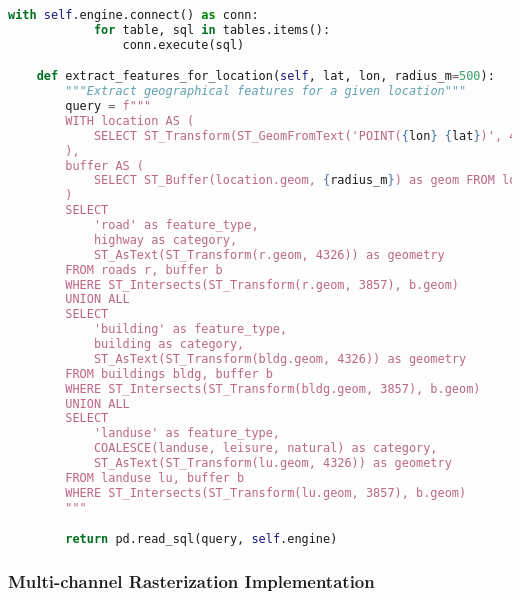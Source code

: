 \begin{lstlisting}[language=Python, caption=Complete OSM Data Processing Pipeline]
        with self.engine.connect() as conn:
            for table, sql in tables.items():
                conn.execute(sql)

    def extract_features_for_location(self, lat, lon, radius_m=500):
        """Extract geographical features for a given location"""
        query = f"""
        WITH location AS (
            SELECT ST_Transform(ST_GeomFromText('POINT({lon} {lat})', 4326), 3857) as geom
        ),
        buffer AS (
            SELECT ST_Buffer(location.geom, {radius_m}) as geom FROM location
        )
        SELECT
            'road' as feature_type,
            highway as category,
            ST_AsText(ST_Transform(r.geom, 4326)) as geometry
        FROM roads r, buffer b
        WHERE ST_Intersects(ST_Transform(r.geom, 3857), b.geom)
        UNION ALL
        SELECT
            'building' as feature_type,
            building as category,
            ST_AsText(ST_Transform(bldg.geom, 4326)) as geometry
        FROM buildings bldg, buffer b
        WHERE ST_Intersects(ST_Transform(bldg.geom, 3857), b.geom)
        UNION ALL
        SELECT
            'landuse' as feature_type,
            COALESCE(landuse, leisure, natural) as category,
            ST_AsText(ST_Transform(lu.geom, 4326)) as geometry
        FROM landuse lu, buffer b
        WHERE ST_Intersects(ST_Transform(lu.geom, 3857), b.geom)
        """

        return pd.read_sql(query, self.engine)
\end{lstlisting}

\subsubsection{Multi-channel Rasterization Implementation}

